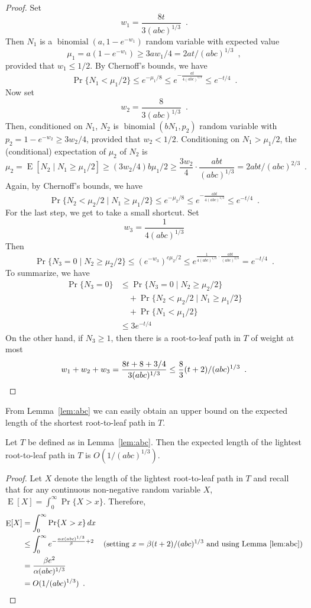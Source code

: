 \documentclass[a4paper,UKenglish]{lipics-v2016}
\DeclareMathOperator{\E}{E}
\DeclareMathOperator{\binomial}{binomial}
\begin{document}
\begin{proof}
  Set 
  \[  
        w_1=\frac{8t}{3(abc)^{1/3}} \enspace .
  \]
  Then $N_1$ is a $\binomial(a,1-e^{-w_1})$ random variable with expected value
  \[
     \mu_1 = a(1-e^{-w_1}) \ge 3aw_1/4 = 2at/(abc)^{1/3} \enspace ,
  \]
  provided that $w_1 \le 1/2$.
  By Chernoff's bounds, we have
  \[
      \Pr\{N_1 < \mu_1/2\} \le e^{-\mu_1/8}\le e^{-\frac{at}{4(abc)^{1/3}}} \le e^{-t/4} \enspace .
  \]
  Now set
   \[  
        w_2=\frac{8}{3(abc)^{1/3}} \enspace .
  \]
  Then, conditioned on $N_1$, $N_2$ is $\binomial(bN_1, p_2)$ random
  variable with $p_2=1-e^{-w_2}\ge 3w_2/4$, provided that $w_2<1/2$.
  Conditioning on $N_1>\mu_1/2$, the (conditional) expectation of $\mu_2$
  of $N_2$ is
  \[
     \mu_2 = \E[N_2\mid N_1\ge \mu_1/2] 
      \ge (3w_2/4)b\mu_1/2 
      \ge \frac{3w_2}{4}\cdot\frac{abt}{(abc)^{1/3}}
       = 2abt/(abc)^{2/3} \enspace .
  \]   
  Again, by Chernoff's bounds, we have
  \[
     \Pr\{N_2 < \mu_2/2\mid N_1 \ge \mu_1/2\} 
       \le e^{-\mu_2/8} \le e^{-\frac{abt}{4(abc)^{1/3}}} \le e^{-t/4} \enspace .
  \]
  For the last step, we get to take a small shortcut.  Set
  \[
     w_3=\frac{1}{4(abc)^{1/3}}
  \]
  Then
  \[
    \Pr\{N_3 = 0\mid N_2\ge \mu_2/2\} 
        \le (e^{-w_3})^{c\mu_2/2}
        \le e^{\frac{1}{4(abc)^{1/3}}\cdot\frac{abt}{(abc)^{2/3}}} = e^{-t/4} \enspace .
  \]
  To summarize, we have
  \begin{align*}
    \Pr\{N_3 = 0\}
      & \le \Pr\{N_3=0\mid N_2 \ge \mu_2/2\} \\
      & \quad {}+\Pr\{N_2<\mu_2/2\mid N_1 \ge \mu_1/2\} \\
       & \quad {}+\Pr\{N_1<\mu_1/2\} \\
       & \le 3e^{-t/4}
  \end{align*}
  On the other hand, if $N_3\ge 1$, then there is a root-to-leaf path in $T$ of weight at most 
  \[
     w_1+w_2+w_3 = \frac{8t+8+3/4}{3(abc)^{1/3}} \le \frac{8}{3}(t+2)/(abc)^{1/3}\enspace . \qedhere
  \]
\end{proof}


From Lemma~\ref{lem:abc} we can easily obtain an upper bound on the expected length of the shortest root-to-leaf path in $T$.

\begin{corollary}
  Let $T$ be defined as in Lemma~\ref{lem:abc}. Then the expected length of the lightest root-to-leaf path in $T$ is $O(1/(abc)^{1/3})$.
\end{corollary}

\begin{proof}
  Let $X$ denote the length of the lightest root-to-leaf path in $T$ and recall that for any continuous non-negative random variable $X$, $\E[X]=\int_0^\infty \Pr\{X>x\}$.  Therefore,
 \begin{align*}
  \E[X] & = \int_0^\infty \Pr\{X>x\}\,dx \\
      & \le \int_0^\infty e^{-\frac{\alpha x(abc)^{1/3}}{\beta}+2} & \text{(setting $x=\beta(t+2)/(abc)^{1/3}$ and using Lemma~\ref{lem:abc})} \\
      & = \frac{\beta e^2}{\alpha(abc)^{1/3}} \\
      & = O(1/(abc)^{1/3}) \enspace .&  \qedhere
 \end{align*}
\end{proof}
\end{document}
